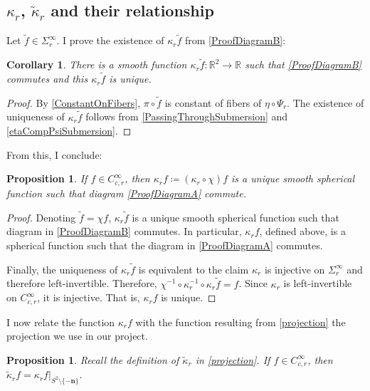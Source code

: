 \documentclass[a4paper,11pt]{scrartcl}
\newcounter{dummy}
\numberwithin{dummy}{section}
\theoremstyle{plain}
\newtheorem{proposition}[dummy]{Proposition}
\theoremstyle{plain}
\theoremstyle{plain}
\theoremstyle{plain}
\newtheorem{corollary}[dummy]{Corollary}
\theoremstyle{nonumberplain}
\newtheorem{proof}{Proof}
\newcommand{\F}[1][R]{\mathbb{#1}} %
\begin{document}
	\subsection{$ \kappa_{r} $, $ \widetilde{\kappa}_{r} $ and their relationship}
	Let $ \widetilde{f} \in \Sigma_{r}^{\infty} $. I prove the existence of $ \kappa_{r} \widetilde{f} $ from \autoref{ProofDiagramB}:
	\begin{corollary}
		\label{ExistAndUniqueKappa}
		There is a smooth function $ \kappa_{r} \widetilde{f} : \F^{2} \to \F $ such that \autoref{ProofDiagramB} commutes and this $ \kappa_{r} \widetilde{f} $ is unique.
	\end{corollary}
	
	\begin{proof}
		By \cref{ConstantOnFibers}, $ \pi \circ \widetilde{f} $ is constant of fibers of $ \eta \circ \Psi_{r} $. The existence of uniqueness of $ \kappa_{r} \widetilde{f} $ follows from \cref{PassingThroughSubmersion} and \cref{etaCompPsiSubmersion}.
	\end{proof}
	
	From this, I conclude:
	\begin{proposition}
		If $ f \in C_{c,r}^{\infty} $, then $ \kappa_{r} f \coloneqq (\kappa_{r} \circ \chi) f $ is a unique smooth spherical function such that diagram \autoref{ProofDiagramA} commute.
	\end{proposition}
	
	\begin{proof}
		Denoting $ \widetilde{f} = \chi f $, $ \kappa_{r} \widetilde{f} $ is a unique smooth spherical function such that diagram in \autoref{ProofDiagramB} commutes. In particular, $ \kappa_{r} f $, defined above,  is a spherical function such that the diagram in \autoref{ProofDiagramA} commutes. 
		
		Finally, the uniqueness of $ \kappa_{r} \widetilde{f} $ is equivalent to the claim $ \kappa_{r} $ is injective on $ \Sigma_{r}^{\infty} $ and therefore left-invertible. Therefore, $ \chi^{-1} \circ \kappa_{r}^{-1} \circ \kappa_{r} \widetilde{f} = f  $. Since $ \kappa_{r} $ is left-invertible on $ C_{c,r}^{\infty}$, it is injective. That is, $ \kappa_{r} f $ is unique.
	\end{proof}
	
	I now relate the function $ \kappa_{r} f $ with the function resulting from \eqref{projection} the projection we use in our project. 
	\begin{proposition}
		Recall the definition of $ \widetilde{\kappa}_{r}  $ in \eqref{projection}. If $ f \in C_{c,r}^{\infty} $, then $ \widetilde{\kappa}_{r} f = \kappa_{r} f \big|_{S^{2} \setminus \{ - \mathbf{n} \}} $.
	\end{proposition}
	
\end{document}
